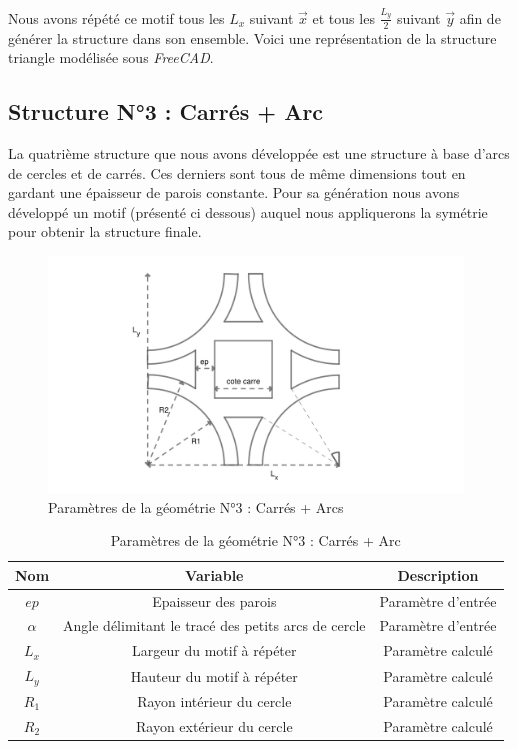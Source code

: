 \documentclass[a4paper]{article}
\begin{document}
	Nous avons répété ce motif tous les $L_x$ suivant $\vec{x}$ et tous les $\frac{L_y}{2}$ suivant $\vec{y}$ afin de générer la structure dans son ensemble. Voici une représentation de la structure triangle modélisée sous \textit{FreeCAD}.
	\newpage
	
	\subsection{Structure N°3 : Carrés + Arc}
	\hspace{0.5cm}La quatrième structure que nous avons développée est une structure à base d’arcs de cercles et de carrés. Ces derniers sont tous de même dimensions tout en gardant une épaisseur de parois constante. Pour sa génération nous avons développé un motif (présenté ci dessous) auquel nous appliquerons la symétrie pour obtenir la structure finale.
	
	\begin{figure}[H]
		\centering
		\includegraphics[width=11cm]{Images/5/carres+arc_2D.pdf}
		\caption{Paramètres de la géométrie N°3 : Carrés + Arcs}
		\label{struct_no3}
	\end{figure}
	
	\begin{table}[H]
		\centering
		\begin{tabular}{|c|c|c|}
			\hline
			\rowcolor{Gray}
			\textbf{Nom} & \textbf{Variable} & \textbf{Description} \\
			\hline\hline
			$ep$ & Epaisseur des parois & Paramètre d'entrée \\
			$\alpha$ & Angle délimitant le tracé des petits arcs de cercle & Paramètre d'entrée \\
			$L_x$ & Largeur du motif à répéter & Paramètre calculé \\
			$L_y$ & Hauteur du motif à répéter & Paramètre calculé \\
			$R_1$ & Rayon intérieur du cercle & Paramètre calculé \\
			$R_2$ & Rayon extérieur du cercle & Paramètre calculé \\
			\hline
		\end{tabular}
		\caption{Paramètres de la géométrie N°3 : Carrés + Arc}
	\end{table}
	
\end{document}
